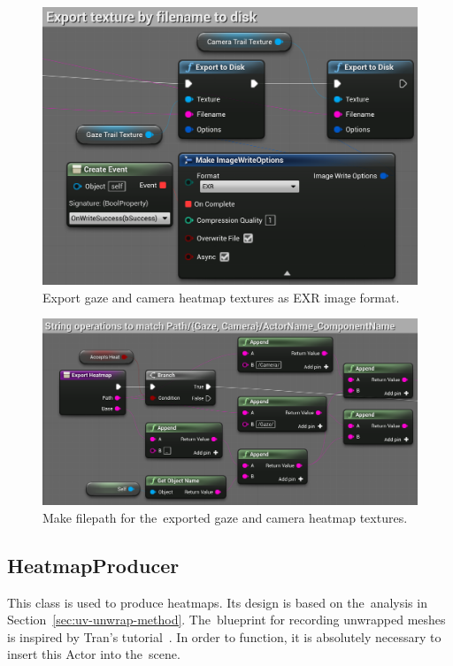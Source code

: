 \pagebreak{}

\begin{figure}[!ht]
    \centering
    \includegraphics[width=\textwidth]{img/export-both-heatmap-textures.png}
    \caption{Export gaze and camera heatmap textures as EXR image format.}
    \label{fig:export-heatmaps-exr}
\end{figure}

\begin{figure}[!ht]
    \centering
    \includegraphics[width=\textwidth]{img/make-texture-filepath.png}
    \caption{Make filepath for the~exported gaze and camera heatmap textures.}
    \label{fig:make-filepath}
\end{figure}

\pagebreak{}

\subsection{HeatmapProducer}
\label{sec:uv-unwrap-implementation}
This class is used to produce heatmaps. Its design is based on the~analysis in Section~\ref{sec:uv-unwrap-method}. The~blueprint for recording unwrapped meshes is inspired by Tran's tutorial~\cite{tran2018wenderlich}. In order to function, it is absolutely necessary to insert this Actor into the~scene.

